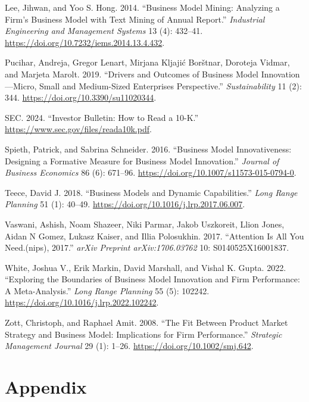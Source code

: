 \documentclass[
]{article}
\newlength{\cslhangindent}
\newenvironment{CSLReferences}[2] %
 {\begin{list}{}{%
  \setlength{\itemindent}{0pt}
  \setlength{\leftmargin}{0pt}
  \setlength{\parsep}{0pt}
  \ifodd #1
   \setlength{\leftmargin}{\cslhangindent}
   \setlength{\itemindent}{-1\cslhangindent}
  \fi
  \setlength{\itemsep}{#2\baselineskip}}}
 {\end{list}}
\begin{document}
\begin{CSLReferences}{1}{0}
Lee, Jihwan, and Yoo S. Hong. 2014. {``Business {Model} {Mining}:
{Analyzing} a {Firm}'s {Business} {Model} with {Text} {Mining} of
{Annual} {Report}.''} \emph{Industrial Engineering and Management
Systems} 13 (4): 432--41.
\url{https://doi.org/10.7232/iems.2014.13.4.432}.

Pucihar, Andreja, Gregor Lenart, Mirjana Kljajić Borštnar, Doroteja
Vidmar, and Marjeta Marolt. 2019. {``Drivers and {Outcomes} of
{Business} {Model} {Innovation}---{Micro}, {Small} and {Medium}-{Sized}
{Enterprises} {Perspective}.''} \emph{Sustainability} 11 (2): 344.
\url{https://doi.org/10.3390/su11020344}.

SEC. 2024. {``Investor {Bulletin}: {How} to {Read} a 10-{K}.''}
\url{https://www.sec.gov/files/reada10k.pdf}.

Spieth, Patrick, and Sabrina Schneider. 2016. {``Business Model
Innovativeness: Designing a Formative Measure for Business Model
Innovation.''} \emph{Journal of Business Economics} 86 (6): 671--96.
\url{https://doi.org/10.1007/s11573-015-0794-0}.

Teece, David J. 2018. {``Business Models and Dynamic Capabilities.''}
\emph{Long Range Planning} 51 (1): 40--49.
\url{https://doi.org/10.1016/j.lrp.2017.06.007}.

Vaswani, Ashish, Noam Shazeer, Niki Parmar, Jakob Uszkoreit, Llion
Jones, Aidan N Gomez, Lukasz Kaiser, and Illia Polosukhin. 2017.
{``Attention Is All You Need.(nips), 2017.''} \emph{arXiv Preprint
arXiv:1706.03762} 10: S0140525X16001837.

White, Joshua V., Erik Markin, David Marshall, and Vishal K. Gupta.
2022. {``Exploring the Boundaries of Business Model Innovation and Firm
Performance: {A} Meta-Analysis.''} \emph{Long Range Planning} 55 (5):
102242. \url{https://doi.org/10.1016/j.lrp.2022.102242}.

Zott, Christoph, and Raphael Amit. 2008. {``The Fit Between Product
Market Strategy and Business Model: Implications for Firm
Performance.''} \emph{Strategic Management Journal} 29 (1): 1--26.
\url{https://doi.org/10.1002/smj.642}.

\end{CSLReferences}

\newpage{}

\section{Appendix}\label{appendix}
\end{document}
